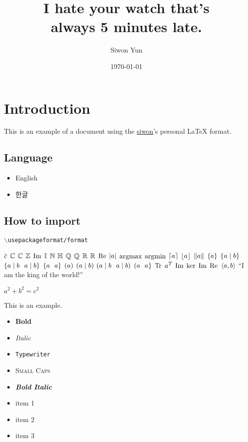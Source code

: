 \documentclass[]{article}
\title{I hate your watch that's\\
        always 5 minutes late.}
\date{\today}
\author{Siwon Yun}
\begin{document}
\maketitle
\tableofcontents

\section{Introduction}
This is an example of a document using the \href{https://www.github.com/ysw421}{siwon}'s personal \LaTeX{} format.

\subsection{Language}
\begin{itemize}
  \item English
  \item 한글
\end{itemize}

\subsection{How to import}
\texttt{$\backslash{}$usepackage{format/format}}

$\overline{ c }$
$\mathbb{C}$
$\mathbb{C}$
$\mathbb{Z}$
$\operatorname{Im}$
$\mathbb{I}$
$\mathbb{N}$
$\mathbb{H}$
$\mathbb{Q}$
$\mathbb{Q}$
$\mathbb{R}$
$\mathbb{R}$
$\operatorname{Re}$
$\left| a \right|$
$\operatorname{argmax}$
$\operatorname{argmin}$
$\left\lceil a \right\rceil$
$\left\lfloor a \right\rfloor$
$\left\| a \right\|$
$\left\{ a \right\}$
$\left\{ a \;\middle|\; b \right\}$
$\left\{ a \;\middle|\; b \right.$
$\left. a \;\middle|\; b \right\}$
$\left\{ a \right.$
$\left. a \right\}$
$\left( a \right)$
$\left( a \;\middle|\; b \right)$
$\left( a \;\middle|\; b \right.$
$\left. a \;\middle|\; b \right)$
$\left( a \right.$
$\left. a \right\}$
$\operatorname{Tr}$
${ a }^T$
$\operatorname{Im}$
$\ker$
$\operatorname{Im}$
$\operatorname{Re}$
$\langle a , b \rangle$
\hyphenquote{english}{I am the king of the world!}
\begin{theorem}
  $a^2 + b^2 = c^2$
\end{theorem}
\begin{example}
  This is an example.
\end{example}
\begin{itemize}
  \item \textbf{Bold}
  \item \textit{Italic}
  \item \texttt{Typewriter}
  \item \textsc{Small Caps}
  \item \textbf{\textit{Bold Italic}}
  \item item 1
  \item item 2
  \item item 3
\end{itemize}
\lipsum[1]
\lipsum[1]
\lipsum[1]
\end{document}
